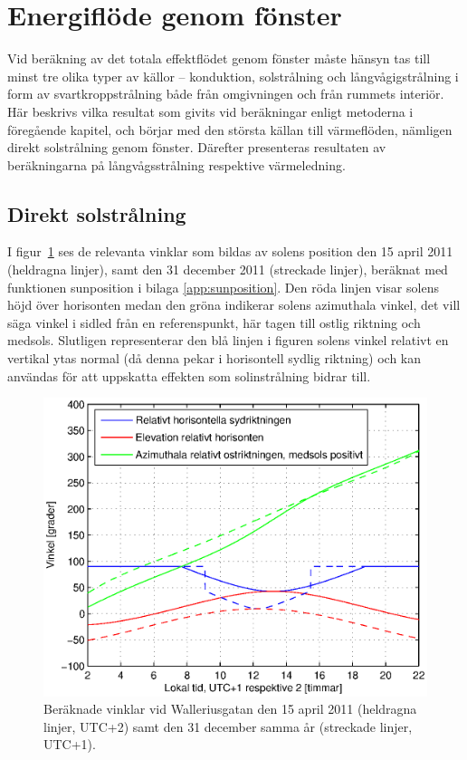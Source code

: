 \section{Energiflöde genom fönster}

Vid beräkning av det totala effektflödet genom fönster måste hänsyn tas till minst tre olika typer av källor – konduktion, solstrålning och långvågigstrålning i form av svartkroppstrålning både från omgivningen och från rummets interiör. Här beskrivs vilka resultat som givits vid beräkningar enligt metoderna i föregående kapitel, och börjar med den största källan till värmeflöden, nämligen direkt solstrålning genom fönster. Därefter presenteras resultaten av beräkningarna på långvågsstrålning respektive värmeledning.

\subsection{Direkt solstrålning}
I figur~\ref{fig:sun0415and1231} ses de relevanta vinklar som bildas av solens position den 15 april 2011 (heldragna linjer), samt den 31 december 2011 (streckade linjer), beräknat med funktionen sunposition i bilaga \ref{app:sunposition}. Den röda linjen visar solens höjd över horisonten medan den gröna indikerar solens azimuthala vinkel, det vill säga vinkel i sidled från en referenspunkt, här tagen till ostlig riktning och medsols. Slutligen representerar den blå linjen i figuren solens vinkel relativt en vertikal ytas normal (då denna pekar i horisontell sydlig riktning) och kan användas för att uppskatta effekten som solinstrålning bidrar till.

\begin{figure}[hpbt]
\centering
\includegraphics[scale=0.7]{images/sun0415and1231.eps}
\caption{\label{fig:sun0415and1231} Beräknade vinklar vid Walleriusgatan den 15 april 2011 (heldragna linjer, UTC+2) samt den 31 december samma år (streckade linjer, UTC+1).}
\end{figure}

